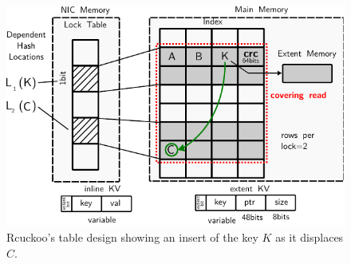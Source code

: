 
\begin{figure}[t]
    \includegraphics[width=0.99\linewidth]{fig/table-diagram.pdf}
    \caption{Rcuckoo's table design showing an insert of the key $K$ as it displaces $C$.~}
    \label{fig:table-diagram}
\end{figure}




